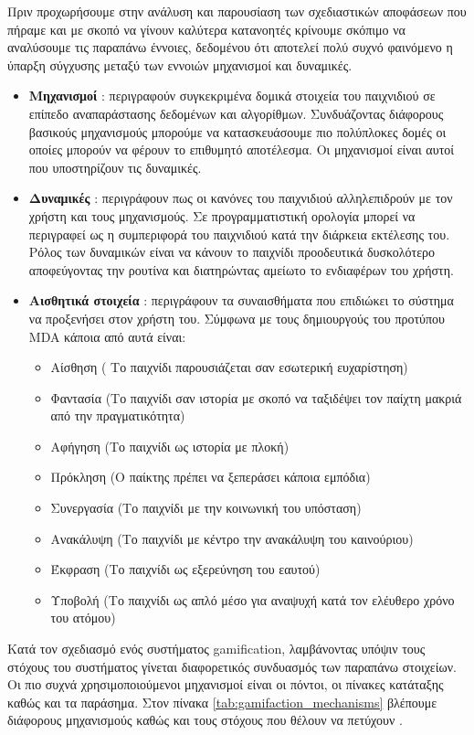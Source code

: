 		Πριν προχωρήσουμε στην ανάλυση και παρουσίαση των σχεδιαστικών αποφάσεων που πήραμε και με σκοπό να γίνουν καλύτερα κατανοητές κρίνουμε σκόπιμο να αναλύσουμε τις παραπάνω έννοιες, δεδομένου ότι αποτελεί πολύ συχνό φαινόμενο η ύπαρξη σύγχυσης μεταξύ των εννοιών μηχανισμοί και δυναμικές.
		\begin{itemize}
			\item \textbf{Μηχανισμοί} : περιγραφούν συγκεκριμένα δομικά στοιχεία του παιχνιδιού σε επίπεδο αναπαράστασης δεδομένων και αλγορίθμων. Συνδυάζοντας διάφορους βασικούς μηχανισμούς μπορούμε να κατασκευάσουμε πιο πολύπλοκες δομές οι οποίες μπορούν να φέρουν το επιθυμητό αποτέλεσμα. Οι μηχανισμοί είναι αυτοί που υποστηρίζουν τις δυναμικές.
			\item \textbf{Δυναμικές} : περιγράφουν πως οι κανόνες του παιχνιδιού αλληλεπιδρούν με τον χρήστη και τους μηχανισμούς. Σε προγραμματιστική ορολογία μπορεί να περιγραφεί ως η συμπεριφορά του παιχνιδιού κατά την διάρκεια εκτέλεσης του. Ρόλος των δυναμικών είναι να κάνουν το παιχνίδι προοδευτικά δυσκολότερο αποφεύγοντας την ρουτίνα και διατηρώντας αμείωτο το ενδιαφέρων του χρήστη.
			\item \textbf{Αισθητικά στοιχεία} :  περιγράφουν τα συναισθήματα που επιδιώκει το σύστημα να προξενήσει στον χρήστη του. Σύμφωνα με τους δημιουργούς του προτύπου MDA κάποια από αυτά είναι:
			\begin{itemize}
				\item Αίσθηση ( Το παιχνίδι παρουσιάζεται σαν εσωτερική ευχαρίστηση)
				\item Φαντασία (Το παιχνίδι σαν ιστορία με σκοπό να ταξιδέψει τον παίχτη μακριά από την πραγματικότητα)
				\item Αφήγηση (Το παιχνίδι ως ιστορία με πλοκή)
				\item Πρόκληση (Ο παίκτης πρέπει να ξεπεράσει κάποια εμπόδια)
				\item Συνεργασία (Το παιχνίδι με την κοινωνική του υπόσταση)
				\item Ανακάλυψη (Το παιχνίδι με κέντρο την ανακάλυψη του καινούριου)
				\item Έκφραση (Το παιχνίδι ως εξερεύνηση του εαυτού)
				\item Υποβολή (Το παιχνίδι ως απλό μέσο για αναψυχή κατά τον ελέυθερο χρόνο
	του ατόμου)
			\end{itemize}
		\end{itemize}
		Κατά τον σχεδιασμό ενός συστήματος gamification, λαμβάνοντας υπόψιν τους στόχους του συστήματος γίνεται διαφορετικός συνδυασμός των παραπάνω στοιχείων. Οι πιο συχνά χρησιμοποιούμενοι μηχανισμοί είναι οι πόντοι, οι πίνακες κατάταξης καθώς και τα παράσημα. Στον πίνακα \ref{tab:gamifaction_mechanisms} βλέπουμε διάφορους μηχανισμούς καθώς και τους στόχους που θέλουν να πετύχουν \cite{raey}\cite{Lucassen2014194}.
	

